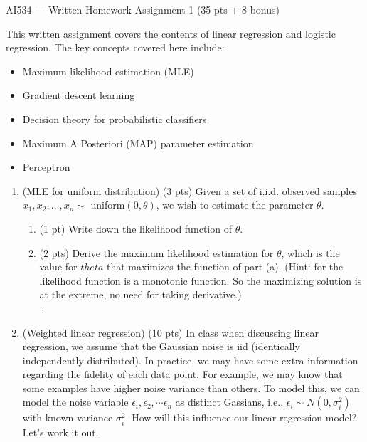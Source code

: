 \documentclass{article}
\begin{document}
{\Large
\begin{center}
AI534 --- Written Homework Assignment 1 (35 pts + 8 bonus) 
\end{center}
}
\noindent This written assignment covers the contents of linear regression and logistic regression. The key concepts covered here include:
\begin{itemize}
    \item Maximum likelihood estimation  (MLE)
    \item Gradient descent learning
    \item Decision theory for probabilistic classifiers
    \item Maximum A Posteriori (MAP) parameter estimation 
    \item Perceptron
\end{itemize}
\begin{enumerate}
\item (MLE for uniform distribution) (3 pts) Given a set of i.i.d. observed samples $x_1,x_2,...,x_n\sim$ uniform$(0,\theta)$, we wish to estimate the parameter $\theta$.
\begin{enumerate}
\item (1 pt) Write down the likelihood function of $\theta$.\\
 \item (2 pts) Derive the maximum likelihood estimation for $\theta$, which is the value for $theta$ that maximizes the function of part (a). (Hint: for the likelihood function is a monotonic function. So the maximizing solution is at the extreme, no need for taking derivative.)\\
.
\end{enumerate}

\item (Weighted linear regression) (10 pts) In class when discussing linear regression, we assume that the Gaussian noise is iid (identically independently distributed). In practice, we may have some extra information regarding the fidelity of each data point. For example, we may know that some examples have higher noise variance than others. To model this, we can model the noise variable $\epsilon_i, \epsilon_2, \cdots \epsilon_n$ as distinct Gassians, i.e., $\epsilon_i \sim N(0, \sigma_i^2)$ with known variance $\sigma_i^2$. How will this influence our linear regression model? Let's work it out.


\end{enumerate}
\end{document}
